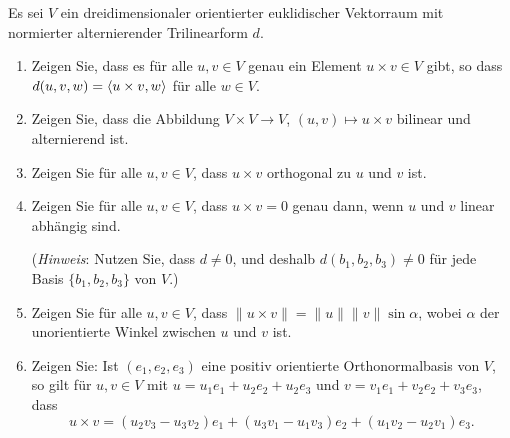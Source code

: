 \begin{question}[subtitle = Konstruktion und Eigenschaften des Kreuzprodukts]{3}
  Es sei $V$ ein dreidimensionaler orientierter euklidischer Vektorraum mit normierter alternierender Trilinearform $d$.
  \begin{enumerate}[leftmargin=*]
    \item
      Zeigen Sie, dass es für alle $u, v \in V$ genau ein Element $u \times v \in V$ gibt, so dass $d(u,v,w) = \left\langle u \times v, w \right\rangle$ für alle $w \in V$.
    \item
      Zeigen Sie, dass die Abbildung $V \times V \to V$, $(u,v) \mapsto u \times v$ bilinear und alternierend ist.
    \item
      Zeigen Sie für alle $u, v \in V$, dass $u \times v$ orthogonal zu $u$ und $v$ ist.
    \item
      Zeigen Sie für alle $u, v \in V$, dass $u \times v = 0$ genau dann, wenn $u$ und $v$ linear abhängig sind.
      
      (\emph{Hinweis}:
       Nutzen Sie, dass $d \neq 0$, und deshalb $d(b_1, b_2, b_3) \neq 0$ für jede Basis $\{b_1, b_2, b_3\}$ von $V$.)
    \item
      Zeigen Sie für alle $u, v \in V$, dass $\|u \times v\| = \|u\| \|v\| \sin \alpha$, wobei $\alpha$ der unorientierte Winkel zwischen $u$ und $v$ ist.
    \item
      Zeigen Sie:
      Ist $(e_1, e_2, e_3)$ eine positiv orientierte Orthonormalbasis von $V$, so gilt für $u, v \in V$ mit $u = u_1 e_1 + u_2 e_2 + u_2 e_3$ und $v = v_1 e_1 + v_2 e_2 + v_3 e_3$, dass
      \[
        u \times v = (u_2 v_3 - u_3 v_2) e_1 + (u_3 v_1 - u_1 v_3) e_2 + (u_1 v_2 - u_2 v_1) e_3.
      \]
  \end{enumerate}
\end{question}







